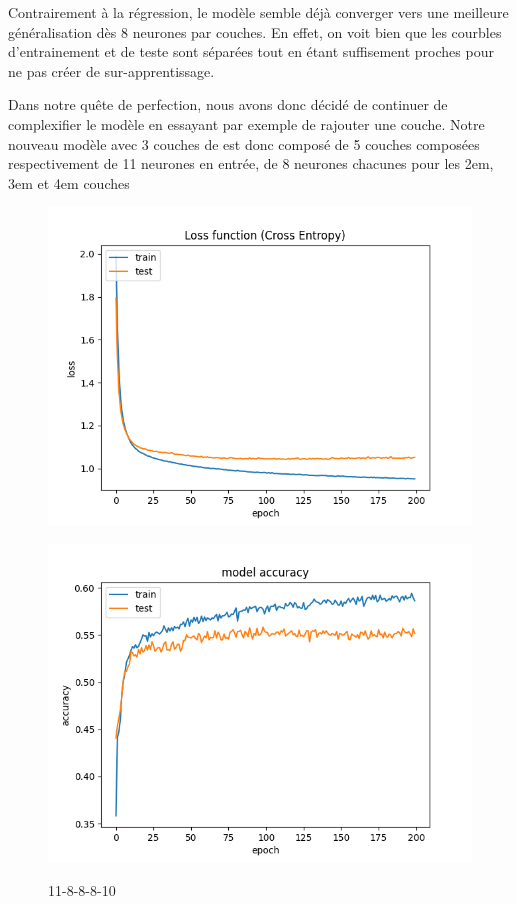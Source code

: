 \vspace{1cm}

Contrairement à la régression, le modèle semble déjà converger vers une meilleure généralisation dès 8 neurones par couches.
En effet, on voit bien que les courbles d'entrainement et de teste sont séparées tout en étant suffisement proches pour ne pas créer de
sur-apprentissage.

Dans notre quête de perfection, nous avons donc décidé de continuer de complexifier le modèle en essayant par exemple de rajouter une couche.
Notre nouveau modèle avec 3 couches de  est donc composé de 5 couches composées respectivement de 11 neurones en entrée, de 8 neurones chacunes pour les 2em, 3em et 4em couches

\begin{figure}[!htb]
    \begin{minipage}{0.5\textwidth}
        \centering
        \includegraphics[width=1\textwidth]{../images/11-12-12-12/Loss function(Cross entropy).png}
        \label{fig:11-12-12-10}
    \end{minipage}\hfill
    \begin{minipage}{0.5\textwidth}
        \centering
        \includegraphics[width=1\textwidth]{../images/11-12-12-12/model accuracy(Cross entropy).png}
        \label{fig:11-12-12-10.2}
    \end{minipage}
    \caption{11-8-8-8-10}
\end{figure}
